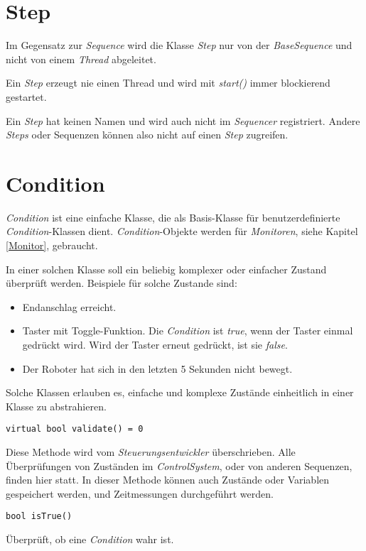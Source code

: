 \section{Step}
Im Gegensatz zur \textit{Sequence} wird die Klasse \textit{Step} nur von der \textit{BaseSequence} und nicht von einem \textit{Thread} abgeleitet.

Ein \textit{Step} erzeugt nie einen Thread und wird mit \textit{start()} immer blockierend gestartet.

Ein \textit{Step} hat keinen Namen und wird auch nicht im \textit{Sequencer} registriert.
Andere \textit{Steps} oder Sequenzen können also nicht auf einen \textit{Step} zugreifen.



\section{Condition}
\label{Condition}
\textit{Condition} ist eine einfache Klasse, die als Basis-Klasse für benutzerdefinierte \textit{Condition}-Klassen dient.
\textit{Condition}-Objekte werden für \textit{Monitoren}, siehe Kapitel \ref{Monitor}, gebraucht.

In einer solchen Klasse soll ein beliebig komplexer oder einfacher Zustand überprüft werden.
Beispiele für solche Zustande sind:
\begin{itemize}
\item Endanschlag erreicht.
\item Taster mit Toggle-Funktion. Die \textit{Condition} ist \textit{true}, wenn der Taster einmal gedrückt wird. Wird der Taster erneut gedrückt, ist sie \textit{false}.
\item Der Roboter hat sich in den letzten 5 Sekunden nicht bewegt.
\end{itemize}

Solche Klassen erlauben es, einfache und komplexe Zustände einheitlich in einer Klasse zu abstrahieren.

\begin{lstlisting}
virtual bool validate() = 0
\end{lstlisting}
Diese Methode wird vom \textit{Steuerungsentwickler} überschrieben.
Alle Überprüfungen von Zuständen im \textit{ControlSystem}, oder von anderen Sequenzen, finden hier statt.
In dieser Methode können auch Zustände oder Variablen gespeichert werden, und Zeitmessungen durchgeführt werden.


\begin{lstlisting}
bool isTrue()
\end{lstlisting}
Überprüft, ob eine \textit{Condition} wahr ist.



